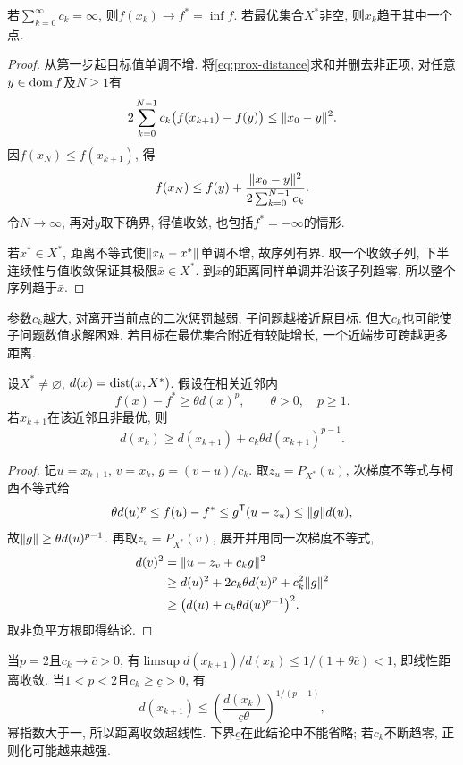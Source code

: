 \begin{theorem}\label{thm:prox-convergence}
若$\sum_{k=0}^\infty c_k=\infty$, 则$f(x_k)\to f^*=\inf f$. 若最优集合$X^*$非空, 则$x_k$趋于其中一个点.
\end{theorem}
\begin{proof}
从第一步起目标值单调不增. 将\eqref{eq:prox-distance}求和并删去非正项, 对任意$y\in\operatorname{dom} f$及$N\ge1$有
\[
 2\sum_{k=0}^{N-1}c_k\bigl(f(x_{k+1})-f(y)\bigr)\le\lVert x_0-y\rVert^2.
\]
因$f(x_N)\le f(x_{k+1})$, 得
\[
 f(x_N)\le f(y)+\frac{\lVert x_0-y\rVert^2}{2\sum_{k=0}^{N-1}c_k}.
\]
令$N\to\infty$, 再对$y$取下确界, 得值收敛, 也包括$f^*=-\infty$的情形.

若$x^*\in X^*$, 距离不等式使$\lVert x_k-x^*\rVert$单调不增, 故序列有界. 取一个收敛子列, 下半连续性与值收敛保证其极限$\bar x\in X^*$. 到$\bar x$的距离同样单调并沿该子列趋零, 所以整个序列趋于$\bar x$.
\end{proof}

参数$c_k$越大, 对离开当前点的二次惩罚越弱, 子问题越接近原目标. 但大$c_k$也可能使子问题数值求解困难. 若目标在最优集合附近有较陡增长, 一个近端步可跨越更多距离.

\begin{proposition}\label{prop:prox-growth}
设$X^*\ne\varnothing$, $d(x)=\operatorname{dist}(x,X^*)$. 假设在相关近邻内
\[
 f(x)-f^*\ge\theta d(x)^p,\qquad\theta>0,\quad p\ge1.
\]
若$x_{k+1}$在该近邻且非最优, 则
\begin{equation}\label{eq:prox-growth-distance}
 d(x_k)\ge d(x_{k+1})+c_k\theta d(x_{k+1})^{p-1}.
\end{equation}
\end{proposition}
\begin{proof}
记$u=x_{k+1}$, $v=x_k$, $g=(v-u)/c_k$. 取$z_u=P_{X^*}(u)$, 次梯度不等式与柯西不等式给
\[
 \theta d(u)^p\le f(u)-f^*\le g^{\mathsf T}(u-z_u)\le\lVert g\rVert d(u),
\]
故$\lVert g\rVert\ge\theta d(u)^{p-1}$. 再取$z_v=P_{X^*}(v)$, 展开并用同一次梯度不等式,
\begin{align*}
 d(v)^2&=\lVert u-z_v+c_k g\rVert^2\\
 &\ge d(u)^2+2c_k\theta d(u)^p+c_k^2\lVert g\rVert^2\\
 &\ge\bigl(d(u)+c_k\theta d(u)^{p-1}\bigr)^2.
\end{align*}
取非负平方根即得结论.
\end{proof}

当$p=2$且$c_k\to\bar c>0$, 有$\limsup d(x_{k+1})/d(x_k)\le1/(1+\theta\bar c)<1$, 即线性距离收敛. 当$1<p<2$且$c_k\ge\underline c>0$, 有
\[
 d(x_{k+1})\le\left(\frac{d(x_k)}{\underline c\theta}\right)^{1/(p-1)},
\]
幂指数大于一, 所以距离收敛超线性. 下界$\underline c$在此结论中不能省略; 若$c_k$不断趋零, 正则化可能越来越强.

